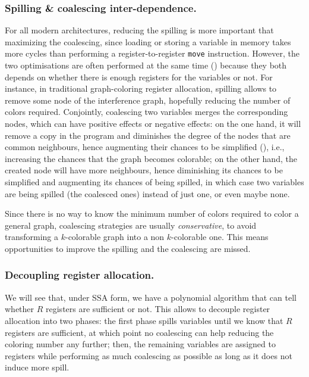 {\subsubsection{Spilling \& coalescing inter-dependence.}
For all modern architectures, reducing the spilling is more important that 
maximizing the coalescing, since loading or storing a variable in memory takes 
more cycles than performing a register-to-register {\tt move} instruction. 
However, the two optimisations are often performed at the same time () because they both depends on whether there is enough 
registers for the variables or not. For instance, in traditional graph-coloring 
register allocation, spilling allows to remove some node of the interference 
graph, hopefully reducing the number of colors required. Conjointly, coalescing 
two variables merges the corresponding nodes, which can have positive effects
or negative effects: on the one hand, it will remove a copy in the program and 
diminishes the degree of the nodes that are common neighbours, hence augmenting 
their chances to be simplified (), i.e., increasing the chances that the graph becomes 
colorable; on the other hand, the created node will have more neighbours, hence 
diminishing its chances to be simplified and augmenting its chances of being 
spilled, in which case two variables are being spilled (the coalesced ones) 
instead of just one, or even maybe none. 

Since there is no way to know the minimum number of colors required to color a 
general graph, coalescing strategies are usually \emph{conservative}, to avoid 
transforming a $k$-colorable graph into a non $k$-colorable one. This means 
opportunities to improve the spilling and the coalescing are missed.

\subsubsection{Decoupling register allocation.}
We will see that, under SSA form, we have a polynomial algorithm that can tell 
whether $R$ registers are sufficient or not. This allows to decouple register 
allocation into two phases: the first phase spills variables until we know that 
$R$ registers are sufficient, at which point no coalescing can help reducing 
the coloring number any further; then, the remaining variables are assigned to 
registers while performing as much coalescing as possible as long as it does 
not induce more spill.

}
